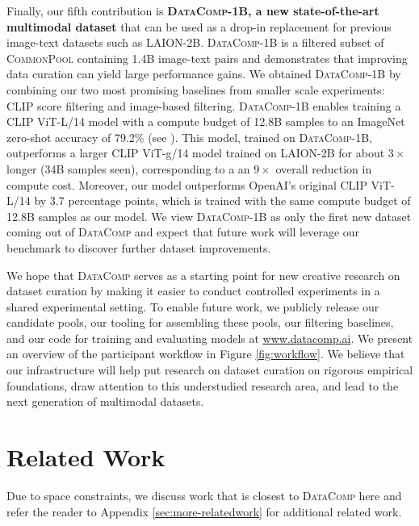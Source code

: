 \documentclass[dvipsnames,11pt]{article}
\newcommand{\datanet}{\textsc{DataComp}\xspace}
\newcommand{\pool}{\textsc{CommonPool}\xspace}
\newcommand{\ours}{\textsc{DataComp}-1B\xspace}
\begin{document}
Finally, our fifth contribution is \textbf{\ours, a new state-of-the-art multimodal dataset} that can be used as a drop-in replacement for previous image-text datasets such as LAION-2B.
\ours is a filtered subset of \pool containing 1.4B image-text pairs and demonstrates that improving data curation can yield large performance gains.
We obtained \ours by combining our two most promising baselines from smaller scale experiments: CLIP score filtering and image-based filtering.
\ours enables training a CLIP ViT-L/14 model with a compute budget of 12.8B samples to an ImageNet zero-shot accuracy of 79.2\% (see ).
This model, trained on \ours, outperforms a larger CLIP ViT-g/14 model trained on LAION-2B for about $3\times$ longer (34B samples seen), corresponding to a an $9\times$ overall reduction in compute cost.
Moreover, our model outperforms OpenAI's original CLIP ViT-L/14 by 3.7 percentage points, which is trained with the same compute budget of 12.8B samples as our model.
We view \ours as only the first new dataset coming out of \datanet and expect that future work will leverage our benchmark to discover further dataset improvements.

We hope that \datanet serves as a starting point for new creative research on dataset curation by making it easier to conduct controlled experiments in a shared experimental setting.
To enable future work, we publicly release our candidate pools, our tooling for assembling these pools, our filtering baselines, and our code for training and evaluating models at \url{www.datacomp.ai}.
We present an overview of the participant workflow in Figure \ref{fig:workflow}.
We believe that our infrastructure will help put research on dataset curation on rigorous empirical foundations, draw attention to this understudied research area, and lead to the next generation of multimodal datasets.


\section{Related Work}
\label{sec:relatedwork}
Due to space constraints, we discuss work that is closest to \datanet here and refer the reader to Appendix \ref{sec:more-relatedwork} for additional related work.
\end{document}
